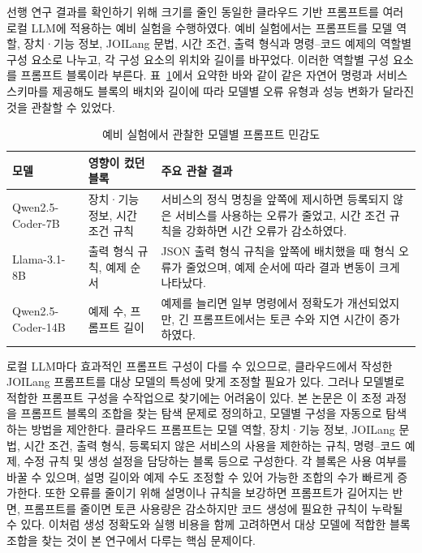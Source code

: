 \documentclass[10pt,twocolumn]{article}
\newenvironment{revision}{\begingroup\color{revisionblue}}{\endgroup}
\begin{document}
선행 연구 결과를 확인하기 위해 크기를 줄인 동일한 클라우드 기반 프롬프트를 여러 로컬 LLM에 적용하는 예비 실험을 수행하였다. 예비 실험에서는 프롬프트를 모델 역할, 장치·기능 정보, JOILang 문법, 시간 조건, 출력 형식과 명령--코드 예제의 역할별 구성 요소로 나누고, 각 구성 요소의 위치와 길이를 바꾸었다. 이러한 역할별 구성 요소를 프롬프트 블록이라 부른다. 표~\ref{tab:pilot_prompt_sensitivity}에서 요약한 바와 같이 같은 자연어 명령과 서비스 스키마를 제공해도 블록의 배치와 길이에 따라 모델별 오류 유형과 성능 변화가 달라진 것을 관찰할 수 있었다.

\begin{table}[t]
\centering
\caption{예비 실험에서 관찰한 모델별 프롬프트 민감도}
\label{tab:pilot_prompt_sensitivity}
\footnotesize
\renewcommand{\arraystretch}{1.12}
\begin{tabularx}{\columnwidth}{@{}p{}p{}X@{}}
\toprule
\textbf{모델} & \textbf{영향이 컸던 블록} & \textbf{주요 관찰 결과} \\
\midrule
Qwen2.5-Coder-7B & 장치·기능 정보, 시간 조건 규칙 & 서비스의 정식 명칭을 앞쪽에 제시하면 등록되지 않은 서비스를 사용하는 오류가 줄었고, 시간 조건 규칙을 강화하면 시간 오류가 감소하였다. \\
Llama-3.1-8B & 출력 형식 규칙, 예제 순서 & JSON 출력 형식 규칙을 앞쪽에 배치했을 때 형식 오류가 줄었으며, 예제 순서에 따라 결과 변동이 크게 나타났다. \\
Qwen2.5-Coder-14B & 예제 수, 프롬프트 길이 & 예제를 늘리면 일부 명령에서 정확도가 개선되었지만, 긴 프롬프트에서는 토큰 수와 지연 시간이 증가하였다. \\
\bottomrule
\end{tabularx}
\end{table}

\begin{revision}
로컬 LLM마다 효과적인 프롬프트 구성이 다를 수 있으므로, 클라우드에서 작성한 JOILang 프롬프트를 대상 모델의 특성에 맞게 조정할 필요가 있다. 그러나 모델별로 적합한 프롬프트 구성을 수작업으로 찾기에는 어려움이 있다. 본 논문은 이 조정 과정을 프롬프트 블록의 조합을 찾는 탐색 문제로 정의하고, 모델별 구성을 자동으로 탐색하는 방법을 제안한다. 클라우드 프롬프트는 모델 역할, 장치·기능 정보, JOILang 문법, 시간 조건, 출력 형식, 등록되지 않은 서비스의 사용을 제한하는 규칙, 명령--코드 예제, 수정 규칙 및 생성 설정을 담당하는 블록 등으로 구성한다. 각 블록은 사용 여부를 바꿀 수 있으며, 설명 길이와 예제 수도 조정할 수 있어 가능한 조합의 수가 빠르게 증가한다. 또한 오류를 줄이기 위해 설명이나 규칙을 보강하면 프롬프트가 길어지는 반면, 프롬프트를 줄이면 토큰 사용량은 감소하지만 코드 생성에 필요한 규칙이 누락될 수 있다. 이처럼 생성 정확도와 실행 비용을 함께 고려하면서 대상 모델에 적합한 블록 조합을 찾는 것이 본 연구에서 다루는 핵심 문제이다.
\end{revision}
\end{document}
